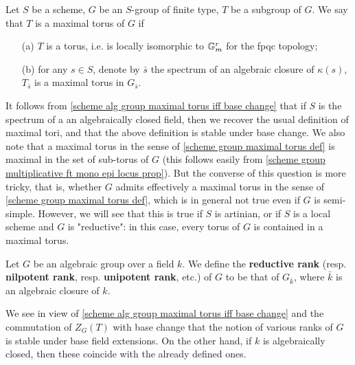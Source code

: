 \begin{definition}\label{scheme group maximal torus def}
Let $S$ be a scheme, $G$ be an $S$-group of finite type, $T$ be a subgroup of $G$. We say that $T$ is a maximal torus of $G$ if
\begin{enumerate}
    \item[(a)] $T$ is a torus, i.e. is locally isomorphic to $\mathbb{G}_m^r$ for the fpqc topology;
    \item[(b)] for any $s\in S$, denote by $\bar{s}$ the spectrum of an algebraic closure of $\kappa(s)$, $T_{\bar{s}}$ is a maximal torus in $G_{\bar{s}}$.  
\end{enumerate}
\end{definition}
It follows from \cref{scheme alg group maximal torus iff base change} that if $S$ is the spectrum of a an algebraically closed field, then we recover the usual definition of maximal tori, and that the above definition is stable under base change. We also note that a maximal torus in the sense of \cref{scheme group maximal torus def} is maximal in the set of sub-torus of $G$ (this follows easily from \cref{scheme group multiplicative ft mono epi locus prop}). But the converse of this question is more tricky, that is, whether $G$ admits effectively a maximal torus in the sense of \cref{scheme group maximal torus def}, which is in general not true even if $G$ is semi-simple. However, we will see that this is true if $S$ is artinian, or if $S$ is a local scheme and $G$ is "reductive": in this case, every torus of $G$ is contained in a maximal torus.

\begin{definition}
Let $G$ be an algebraic group over a field $k$. We define the \textbf{reductive rank} (resp. \textbf{nilpotent rank}, resp. \textbf{unipotent rank}, etc.) of $G$ to be that of $G_{\bar{k}}$, where $\bar{k}$ is an algebraic closure of $k$.
\end{definition}

We see in view of \cref{scheme alg group maximal torus iff base change} and the commutation of $Z_G(T)$ with base change that the notion of various ranks of $G$ is stable under base field extensions. On the other hand, if $k$ is algebraically closed, then these coincide with the already defined ones.

